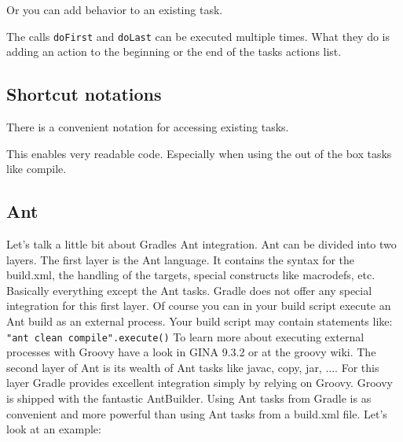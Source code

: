 
\noindent Or you can add behavior to an existing task.


The calls \texttt{doFirst} and \texttt{doLast} can be executed multiple times. What they do is adding an action to the beginning or the end of the tasks actions list.

\subsection{Shortcut notations}
There is a convenient notation for accessing existing tasks.


\noindent This enables very readable code. Especially when using the out of the box tasks like compile.

\subsection{Ant}
Let's talk a little bit about Gradles Ant integration. Ant can be divided into two layers. The first layer is the Ant language. It contains the syntax for the build.xml, the handling of the targets, special constructs like macrodefs, etc. Basically everything except the Ant tasks. Gradle does not offer any special integration for this first layer. Of course you can in your build script execute an Ant build as an external process. Your build script may contain statements like: \texttt{"ant clean compile".execute()}
To learn more about executing external processes with Groovy have a look in GINA 9.3.2 or at the groovy wiki.
The second layer of Ant is its wealth of Ant tasks like javac, copy, jar, .... For this layer Gradle provides excellent integration simply by relying on Groovy. Groovy is shipped with the fantastic AntBuilder. Using Ant tasks from Gradle is as convenient and more powerful than using Ant tasks from a build.xml file. Let's look at an example:

